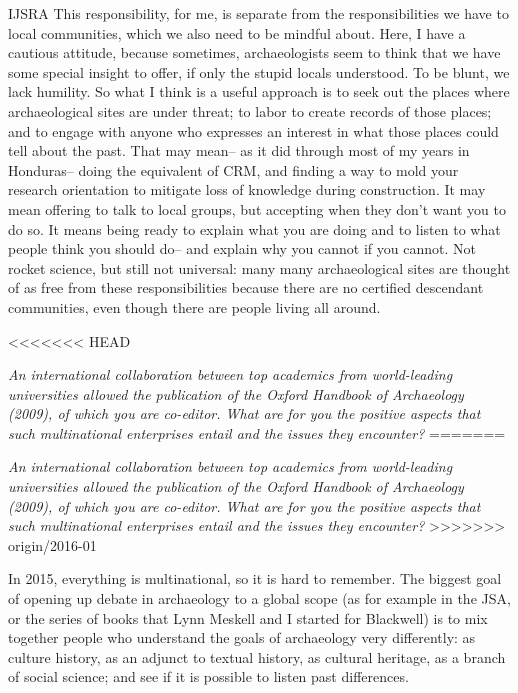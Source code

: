 \begin{labeling}{IJSRA}
This responsibility, for me, is separate from the responsibilities we have to local communities, which we also need to be mindful about. Here, I have a cautious attitude, because sometimes, archaeologists seem to think that we have some special insight to offer, if only the stupid locals understood. To be blunt, we lack humility. So what I think is a useful approach is to seek out the places where archaeological sites are under threat; to labor to create records of those places; and to engage with anyone who expresses an interest in what those places could tell about the past. That may mean-- as it did through most of my years in Honduras-- doing the equivalent of CRM, and finding a way to mold your research orientation to mitigate loss of knowledge during construction. It may mean offering to talk to local groups, but accepting when they don't want you to do so. It means being ready to explain what you are doing and to listen to what people think you should do-- and explain why you cannot if you cannot. Not rocket science, but still not universal: many many archaeological sites are thought of as free from these responsibilities because there are no certified descendant communities, even though there are people living all around.

<<<<<<< HEAD
\item[IJSRA] \emph{An international collaboration between top academics from world-leading universities allowed the publication of the \emph{Oxford Handbook of Archaeology} (2009), of which you are co-editor. What are for you the positive aspects that such multinational enterprises entail and the issues they encounter?}
=======
\item[IJSRA] \textit{An international collaboration between top academics from world-leading universities allowed the publication of the \emph{Oxford Handbook of Archaeology} (2009), of which you are co-editor. What are for you the positive aspects that such multinational enterprises entail and the issues they encounter?}
>>>>>>> origin/2016-01

\item[RAJ] In 2015, everything is multinational, so it is hard to remember. 
The biggest goal of opening up debate in archaeology to a global scope (as for example in the JSA, or the series of books that Lynn Meskell and I started for Blackwell) is to mix together people who understand the goals of archaeology very differently: as culture history, as an adjunct to textual history, as cultural heritage, as a branch of social science; and see if it is possible to listen past differences.


\end{labeling}
